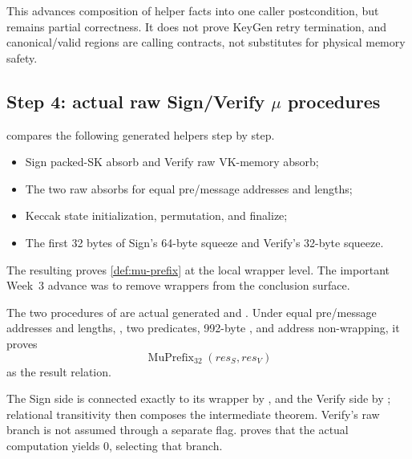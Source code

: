 This advances composition of helper facts into one caller postcondition, but
remains partial correctness. It does not prove KeyGen retry termination, and
canonical/valid regions are calling contracts, not substitutes for physical
memory safety.

\subsection{Step 4: actual raw Sign/Verify \texorpdfstring{\(\mu\)}{mu} procedures}

 compares
the following generated helpers step by step.

\begin{itemize}
  \item Sign packed-SK absorb and Verify raw VK-memory absorb;
  \item The two raw absorbs for equal pre/message addresses and lengths;
  \item Keccak state initialization, permutation, and finalize;
  \item The first 32 bytes of Sign's 64-byte squeeze and Verify's 32-byte squeeze.
\end{itemize}

The resulting  proves
\cref{def:mu-prefix} at the local wrapper level. The important Week~3 advance
was to remove wrappers from the conclusion surface.

\begin{verified}
\label{thm:generated-mu}
The two procedures of  are
actual generated  and
. Under equal pre/message addresses and
lengths, , two  predicates,
992-byte , and address non-wrapping, it proves
\[
  \operatorname{MuPrefix}_{32}(res_S,res_V)
\]
as the result relation.
\end{verified}

The Sign side is connected exactly to its wrapper by
, and the Verify side by
; relational transitivity then
composes the intermediate theorem. Verify's raw branch is not assumed through
a separate flag.  proves that the actual
 computation yields 0, selecting that branch.

